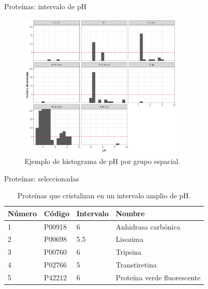 \documentclass{beamer}
\begin{document}
\begin{frame}{Proteínas: intervalo de pH}
 \begin{figure}
 \centering
 \includegraphics[width=0.7\textwidth]{Images/hist_pH_by_gpo_P00698}
 \caption{Ejemplo de histograma de pH por grupo espacial.}
 \end{figure} 
\end{frame}
\begin{frame}{Proteínas: seleccionadas}
\begin{table}[h]
	\centering
	\begin{tabular}{@{}llll@{}}
		\toprule
		Número & Código & Intervalo       & Nombre                              \\ \midrule
		1      & P00918 & 6               & Anhidrasa carbónica                 \\
		2      & P00698 & 5.5             & Lisozima                            \\
		3      & P00760 & 6               & Tripsina                            \\
		4      & P02766 & 5               & Transtiretina                       \\
		5      & P42212 & 6               & Proteína verde fluorescente         \\
\bottomrule
	\end{tabular}
	\caption{Proteínas que cristalizan en un intervalo amplio de pH.}
	\label{tab:list}
\end{table}
\end{frame}
\end{document}
